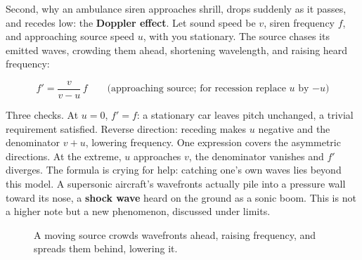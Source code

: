 \begin{mainline}
Second, why an ambulance siren approaches shrill, drops suddenly as it passes, and recedes low: the \textbf{Doppler effect}. Let sound speed be \(v\), siren frequency \(f\), and approaching source speed \(u\), with you stationary. The source chases its emitted waves, crowding them ahead, shortening wavelength, and raising heard frequency:

\[
  f' = \frac{v}{v-u}\,f
  \qquad\text{(approaching source; for recession replace \(u\) by \(-u\))}
\]

Three checks. At \(u=0\), \(f'=f\): a stationary car leaves pitch unchanged, a trivial requirement satisfied. Reverse direction: receding makes \(u\) negative and the denominator \(v+u\), lowering frequency. One expression covers the asymmetric directions. At the extreme, \(u\) approaches \(v\), the denominator vanishes and \(f'\) diverges. The formula is crying for help: catching one's own waves lies beyond this model. A supersonic aircraft's wavefronts actually pile into a pressure wall toward its nose, a \textbf{shock wave} heard on the ground as a sonic boom. This is not a higher note but a new phenomenon, discussed under limits.
\end{mainline}

\begin{figure}[htbp]
\centering
{}
\caption{A moving source crowds wavefronts ahead, raising frequency, and spreads them behind, lowering it.}
\end{figure}

